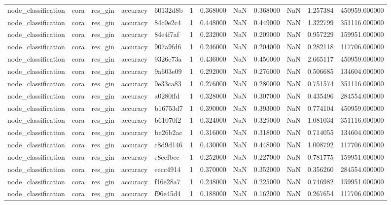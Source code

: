 \begin{tabular}{lllllrrrrrrr}
node_classification & cora & res_gin & accuracy & 60132d8b & 1 & 0.368000 & NaN & 0.368000 & NaN & 1.257384 & 450959.000000 \\
node_classification & cora & res_gin & accuracy & 84c0e2c4 & 1 & 0.448000 & NaN & 0.449000 & NaN & 1.322799 & 351116.000000 \\
node_classification & cora & res_gin & accuracy & 84e4f7af & 1 & 0.232000 & NaN & 0.209000 & NaN & 0.957229 & 159951.000000 \\
node_classification & cora & res_gin & accuracy & 907a9fd6 & 1 & 0.246000 & NaN & 0.204000 & NaN & 0.282118 & 117706.000000 \\
node_classification & cora & res_gin & accuracy & 9326e73a & 1 & 0.436000 & NaN & 0.450000 & NaN & 2.665117 & 450959.000000 \\
node_classification & cora & res_gin & accuracy & 9a603e09 & 1 & 0.292000 & NaN & 0.276000 & NaN & 0.506685 & 134604.000000 \\
node_classification & cora & res_gin & accuracy & 9e33ca83 & 1 & 0.276000 & NaN & 0.280000 & NaN & 0.751574 & 351116.000000 \\
node_classification & cora & res_gin & accuracy & a0280ffd & 1 & 0.328000 & NaN & 0.307000 & NaN & 0.435496 & 284554.000000 \\
node_classification & cora & res_gin & accuracy & b16753d7 & 1 & 0.390000 & NaN & 0.393000 & NaN & 0.774104 & 450959.000000 \\
node_classification & cora & res_gin & accuracy & b61070f2 & 1 & 0.324000 & NaN & 0.329000 & NaN & 1.081034 & 351116.000000 \\
node_classification & cora & res_gin & accuracy & be26b2ac & 1 & 0.316000 & NaN & 0.318000 & NaN & 0.714055 & 134604.000000 \\
node_classification & cora & res_gin & accuracy & c8d9d146 & 1 & 0.430000 & NaN & 0.448000 & NaN & 1.008792 & 117706.000000 \\
node_classification & cora & res_gin & accuracy & e8eefbec & 1 & 0.252000 & NaN & 0.227000 & NaN & 0.781775 & 159951.000000 \\
node_classification & cora & res_gin & accuracy & eecc4914 & 1 & 0.370000 & NaN & 0.352000 & NaN & 0.356260 & 284554.000000 \\
node_classification & cora & res_gin & accuracy & f16e28a7 & 1 & 0.248000 & NaN & 0.225000 & NaN & 0.746982 & 159951.000000 \\
node_classification & cora & res_gin & accuracy & f96e45d4 & 1 & 0.188000 & NaN & 0.162000 & NaN & 0.267654 & 117706.000000 \\

\end{tabular}

